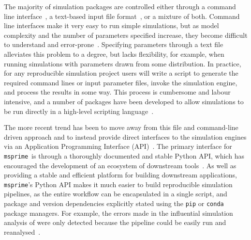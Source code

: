 \documentclass{article}
\newcommand{\msprime}[0]{\texttt{msprime}}
\begin{document}
The majority of simulation packages are controlled either through
a command line interface~\citep[e.g.][]{hudson2002generating,kern2016discoal},
a text-based input file
format~\citep[e.g.][]{guillaume2006nemo,excoffier2011fastsimcoal,shlyakhter2014cosi2},
or a mixture of both.
Command line interfaces make it very easy to run simple
simulations, but as model complexity and the number of parameters specified increase,
they become difficult to understand and
error-prone~\citep{ragsdale2020lessons,gower2021demes}.
Specifying parameters through a text file alleviates this problem to a degree,
but lacks flexibility, for example, when running simulations with parameters
drawn from some distribution. In practice, for any reproducible simulation
project users will write a script
to generate the required command lines or input parameter files,
invoke the simulation engine, and process the results in some way.
This process is cumbersome and labour intensive, and
a number of packages have been developed
to allow simulations to be run directly in a high-level
scripting language~\citep{staab2016coala,parobek2017skelesim,gladstein2018simprily}.

The more recent trend has been to move away from this file and command-line
driven approach and to instead provide direct interfaces to the simulation
engines via an Application Programming Interface (API)~\citep[e.g.][]{
thornton2014cpp,kelleher2016efficient,becheler2019quetzal,haller2019slim}.
The primary interface for \msprime\ is through a thoroughly documented and
stable Python
API, which has encouraged the development of an ecosystem of downstream
tools~\citep{terhorst2017robust,chan2018likelihood,spence2019inference,
adrion2020community,adrion2020predicting, kamm2020efficiently,
mckenzie2020ipcoal, montinaro2020revisiting,
de2021geonomics,rivera2021simulation}.
As well as providing a stable and efficient platform for building
downstream applications, \msprime's Python API makes it much easier to
build reproducible simulation pipelines, as the entire workflow can
be encapsulated in a single script, and package and version
dependencies explicitly stated using the \texttt{pip}
or \texttt{conda} package managers.
For example, the errors made
in the influential simulation analysis of
\cite{martin2017human} were only detected because the pipeline
could be easily run and reanalysed~\citep{ragsdale2020lessons,martin2020erratum}.
\end{document}
